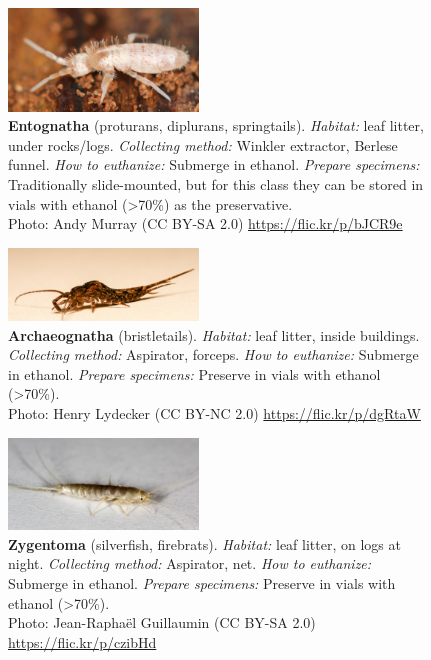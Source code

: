 \documentclass[letterpaper, 11pt]{article}
\begin{document}
\begin{figure}
  \caption*{\textbf{Entognatha} (proturans, diplurans, springtails). \textit{Habitat:} leaf litter, under rocks/logs. \textit{Collecting method:} Winkler extractor, Berlese funnel. \textit{How to euthanize:} Submerge in ethanol. \textit{Prepare specimens:} Traditionally slide-mounted, but for this class they can be stored in vials with ethanol (\textgreater70\%) as the preservative.\\ Photo: Andy Murray (CC BY-SA 2.0) \url{https://flic.kr/p/bJCR9e}}
  \includegraphics[width=0.45\textwidth]{Collembola}
\end{figure}

\begin{figure}
  \caption*{\textbf{Archaeognatha} (bristletails). \textit{Habitat:} leaf litter, inside buildings. \textit{Collecting method:} Aspirator, forceps. \textit{How to euthanize:} Submerge in ethanol. \textit{Prepare specimens:} Preserve in vials with ethanol (\textgreater70\%).\\ Photo: Henry Lydecker (CC BY-NC 2.0) \url{https://flic.kr/p/dgRtaW}}
  \includegraphics[width=0.45\textwidth]{Archeognatha}
\end{figure}

\begin{figure}
  \caption*{\textbf{Zygentoma} (silverfish, firebrats). \textit{Habitat:} leaf litter, on logs at night. \textit{Collecting method:} Aspirator, net. \textit{How to euthanize:} Submerge in ethanol. \textit{Prepare specimens:} Preserve in vials with ethanol (\textgreater70\%).\\ Photo: Jean-Rapha\"{e}l Guillaumin (CC BY-SA 2.0) \url{https://flic.kr/p/czibHd}}
  \includegraphics[width=0.45\textwidth]{Zygentoma}
\end{figure}
\end{document}
